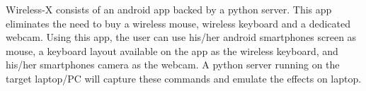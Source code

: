 Wireless-\/X consists of an android app backed by a python server. This app eliminates the need to buy a wireless mouse, wireless keyboard and a dedicated webcam. Using this app, the user can use his/her android smartphone\textquotesingle{}s screen as mouse, a keyboard layout available on the app as the wireless keyboard, and his/her smartphone\textquotesingle{}s camera as the webcam. A python server running on the target laptop/\+PC will capture these commands and emulate the effects on laptop. 